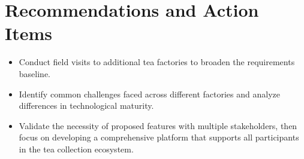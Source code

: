 \section*{Recommendations and Action Items}
\noindent
\begin{itemize}
    \item Conduct field visits to additional tea factories to broaden the requirements baseline.
    \item Identify common challenges faced across different factories and analyze differences in technological maturity.
    \item Validate the necessity of proposed features with multiple stakeholders, then focus on developing a comprehensive platform that supports all participants in the tea collection ecosystem.
\end{itemize}